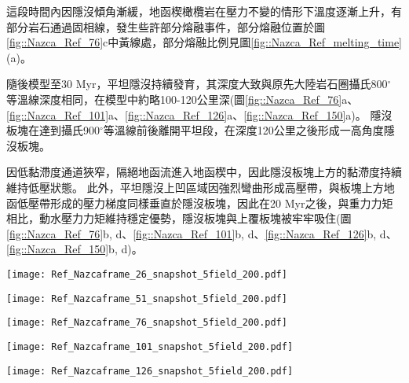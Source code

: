 這段時間內因隱沒傾角漸緩，地函楔橄欖岩在壓力不變的情形下溫度逐漸上升，有部分岩石通過固相線，發生些許部分熔融事件，部分熔融位置於圖\ref{fig::Nazca_Ref_76}c中黃線處，部分熔融比例見圖\ref{fig::Nazca_Ref_melting_time}(a)。

隨後模型至30 Myr，平坦隱沒持續發育，其深度大致與原先大陸岩石圈攝氏800$^{\circ}$等溫線深度相同，在模型中約略100-120公里深(圖\ref{fig::Nazca_Ref_76}a、\ref{fig::Nazca_Ref_101}a、\ref{fig::Nazca_Ref_126}a、\ref{fig::Nazca_Ref_150}a)。
隱沒板塊在達到攝氏900$^{\circ}$等溫線前後離開平坦段，在深度120公里之後形成一高角度隱沒板塊。

因低黏滯度通道狹窄，隔絕地函流進入地函楔中，因此隱沒板塊上方的黏滯度持續維持低壓狀態。
此外，平坦隱沒上凹區域因強烈彎曲形成高壓帶，與板塊上方地函低壓帶形成的壓力梯度同樣垂直於隱沒板塊，因此在20 Myr之後，與重力力矩相比，動水壓力力矩維持穩定優勢，隱沒板塊與上覆板塊被牢牢吸住(圖\ref{fig::Nazca_Ref_76}b, d、\ref{fig::Nazca_Ref_101}b, d、\ref{fig::Nazca_Ref_126}b, d、\ref{fig::Nazca_Ref_150}b, d)。


\begin{figure*}[htp]
    \centering
    \texttt{[image: Ref\_Nazcaframe\_26\_snapshot\_5field\_200.pdf]}
    \caption[納茲卡參考模型於5 Myr時之結果。]{納茲卡參考模型於5 Myr時之結果。}
    \label{fig::Nazca_Ref_26}
\end{figure*}

\begin{figure*}[htp]
    \centering
    \texttt{[image: Ref\_Nazcaframe\_51\_snapshot\_5field\_200.pdf]}
    \caption[納茲卡參考模型於10 Myr時之結果。]{納茲卡參考模型於10 Myr時之結果。}
    \label{fig::Nazca_Ref_51}
\end{figure*}

\begin{figure*}[htp]
    \centering
    \texttt{[image: Ref\_Nazcaframe\_76\_snapshot\_5field\_200.pdf]}
    \caption[納茲卡參考模型於15 Myr時之結果。]{納茲卡參考模型於15 Myr時之結果。}
    \label{fig::Nazca_Ref_76}
\end{figure*}

\begin{figure*}[htp]
    \centering
    \texttt{[image: Ref\_Nazcaframe\_101\_snapshot\_5field\_200.pdf]}
    \caption[納茲卡參考模型於20 Myr時之結果。]{納茲卡參考模型於20 Myr時之結果。}
    \label{fig::Nazca_Ref_101}
\end{figure*}

\begin{figure*}[htp]
    \centering
    \texttt{[image: Ref\_Nazcaframe\_126\_snapshot\_5field\_200.pdf]}
    \caption[納茲卡參考模型於25 Myr時之結果。]{納茲卡參考模型於25 Myr時之結果。}
    \label{fig::Nazca_Ref_126}
\end{figure*}


